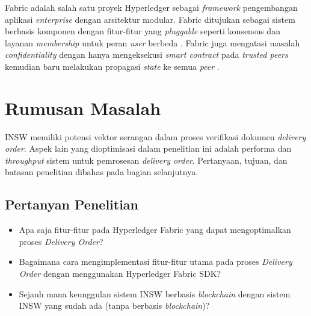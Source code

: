 Fabric adalah salah satu proyek Hyperledger sebagai \textit{framework} pengembangan aplikasi \textit{enterprise} dengan arsitektur modular. Fabric ditujukan sebagai sistem berbasis komponen dengan fitur-fitur yang \textit{pluggable} seperti konsensus dan layanan \textit{membership} untuk peran \textit{user} berbeda \cite{Dhillon2017}. Fabric juga mengatasi masalah \textit{confidentiality} dengan hanya mengeksekusi \textit{smart contract} pada \textit{trusted peers} kemudian baru melakukan propagasi \textit{state} ke semua \textit{peer} \cite{Androulaki2018}. 

\section{Rumusan Masalah}
\label{sec:masalah}

INSW memiliki potensi vektor serangan dalam proses verifikasi dokumen \textit{delivery order}. Aspek lain yang dioptimisasi dalam penelitian ini adalah performa dan \textit{throughput} sistem untuk pemrosesan \textit{delivery order}. Pertanyaan, tujuan, dan batasan penelitian dibahas pada bagian selanjutnya.


\subsection{Pertanyan Penelitian}
\label{sec:pertanyaanPenelitian}

\begin{itemize}
	\item Apa saja fitur-fitur pada Hyperledger Fabric yang dapat mengoptimalkan proses \textit{Delivery Order}?
	\item Bagaimana cara mengimplementasi fitur-fitur utama pada proses \textit{Delivery Order} dengan menggunakan Hyperledger Fabric SDK?
	\item Sejauh mana keunggulan sistem INSW berbasis \textit{blockchain} dengan sistem INSW yang sudah ada (tanpa berbasis \textit{blockchain})?
\end{itemize}


